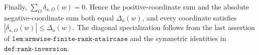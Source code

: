 Finally, \(\sum_O\delta_{a,O}(w)=0\). Hence the positive-coordinate sum and the absolute negative-coordinate sum both equal \(\Delta_a(w)\), and every coordinate satisfies \(|\delta_{a,O}(w)|\le\Delta_a(w)\). The diagonal specialization follows from the last assertion of \(\texttt{lem:armwise-finite-rank-staircase}\) and the symmetric identities in \(\texttt{def:rank-inversion}\).
